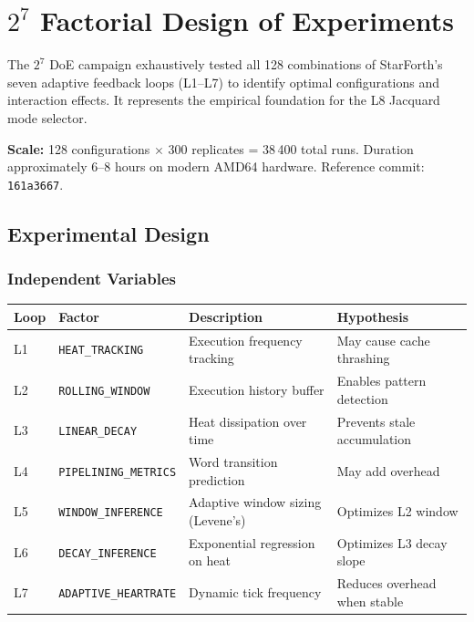 
\section{$2^7$ Factorial Design of Experiments}

The $2^7$ DoE campaign exhaustively tested all 128 combinations of
StarForth's seven adaptive feedback loops (L1--L7) to identify optimal
configurations and interaction effects. It represents the empirical
foundation for the L8 Jacquard mode selector.

\textbf{Scale:} 128 configurations $\times$ 300 replicates = 38\,400
total runs. Duration approximately 6--8 hours on modern AMD64 hardware.
Reference commit: \texttt{161a3667}.

\subsection{Experimental Design}

\subsubsection{Independent Variables}

\begin{center}
\begin{tabular}{llll}
\toprule
Loop & Factor & Description & Hypothesis \\
\midrule
L1 & \texttt{HEAT\_TRACKING}    & Execution frequency tracking     & May cause cache thrashing \\
L2 & \texttt{ROLLING\_WINDOW}   & Execution history buffer          & Enables pattern detection \\
L3 & \texttt{LINEAR\_DECAY}     & Heat dissipation over time        & Prevents stale accumulation \\
L4 & \texttt{PIPELINING\_METRICS} & Word transition prediction      & May add overhead \\
L5 & \texttt{WINDOW\_INFERENCE} & Adaptive window sizing (Levene's) & Optimizes L2 window \\
L6 & \texttt{DECAY\_INFERENCE}  & Exponential regression on heat    & Optimizes L3 decay slope \\
L7 & \texttt{ADAPTIVE\_HEARTRATE} & Dynamic tick frequency          & Reduces overhead when stable \\
\bottomrule
\end{tabular}
\end{center}

